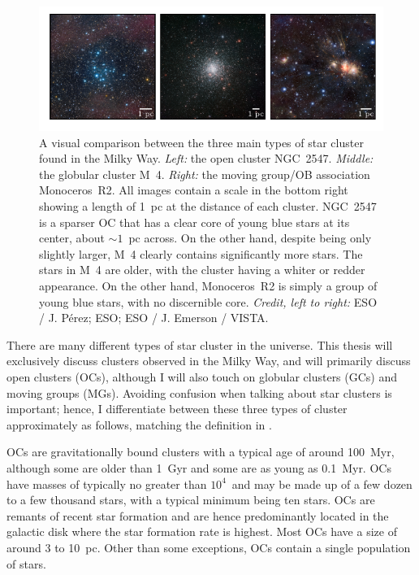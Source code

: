 \begin{figure}[tb]
	\includegraphics[width=\textwidth]{fig/c1/oc_gc_mg_comparison.pdf}
	\caption[A visual comparison between the three main types of star cluster found in the Milky Way.]{A visual comparison between the three main types of star cluster found in the Milky Way. \emph{Left:} the open cluster NGC~2547. \emph{Middle:} the globular cluster M~4. \emph{Right:} the moving group/OB association Monoceros~R2. All images contain a scale in the bottom right showing a length of 1~pc at the distance of each cluster. NGC~2547 is a sparser OC that has a clear core of young blue stars at its center, about $\sim 1$~pc across. On the other hand, despite being only slightly larger, M~4 clearly contains significantly more stars. The stars in M~4 are older, with the cluster having a whiter or redder appearance. On the other hand, Monoceros~R2 is simply a group of young blue stars, with no discernible core. \emph{Credit, left to right:} ESO / J. Pérez; ESO; ESO / J. Emerson / VISTA. }
	\label{fig:intro:definition:comparison}
\end{figure}

There are many different types of star cluster in the universe. This thesis will exclusively discuss clusters observed in the Milky Way, and will primarily discuss open clusters (OCs), although I will also touch on globular clusters (GCs) and moving groups (MGs). Avoiding confusion when talking about star clusters is important; hence, I differentiate between these three types of cluster approximately as follows, matching the definition in \cite{portegies_zwart_young_2010}.

OCs are gravitationally bound clusters with a typical age of around 100~Myr, although some are older than 1~Gyr and some are as young as 0.1~Myr. OCs have masses of typically no greater than $10^4$~\MSun and may be made up of a few dozen to a few thousand stars, with a typical minimum being ten stars. OCs are remants of recent star formation and are hence predominantly located in the galactic disk where the star formation rate is highest. Most OCs have a size of around 3 to 10~pc. Other than some exceptions, OCs contain a single population of stars. 

